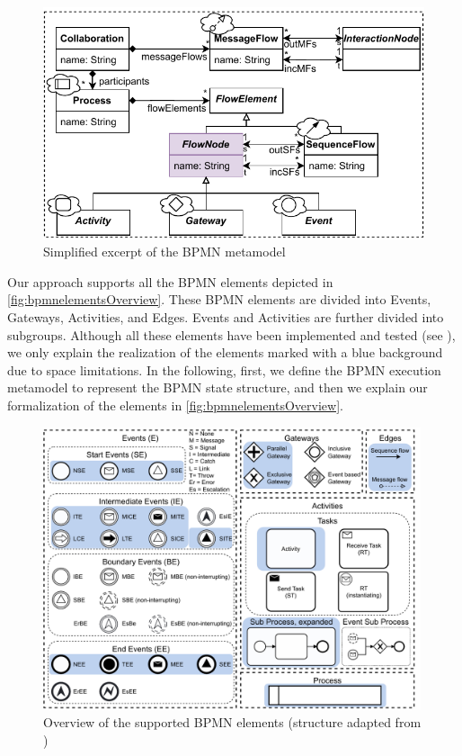 \documentclass{lmcs} %
\begin{document}
\begin{figure}[ht]
  \centering
  \includegraphics[width=0.8\linewidth]{images/bpmn_semantics-bpmn-metamodel.pdf}
  \caption{Simplified excerpt of the BPMN metamodel \cite{objectmanagementgroupBusinessProcessModel2013}}
  \label{fig:bpmnMetamodel}
\end{figure}

Our approach supports all the BPMN elements depicted in \autoref{fig:bpmnelementsOverview}.
These BPMN elements are divided into \textsf{Events}, \textsf{Gateways}, \textsf{Activities}, and \textsf{Edges}.
\textsf{Events} and \textsf{Activities} are further divided into subgroups.
Although all these elements have been implemented and tested (see \cite{timkrauterLMCS2024Artifacts2023}), we only explain the realization of the elements marked with a blue background due to space limitations.
In the following, first, we define the BPMN execution metamodel to represent the BPMN state structure, and then we explain our formalization of the elements in \autoref{fig:bpmnelementsOverview}.


\begin{figure}[ht]
    \centering
    \includegraphics[width=0.99\textwidth]{images/bpmn_semantics-elements-overview.pdf}
    \caption{Overview of the supported BPMN elements (structure adapted from \cite{houhouFirstOrderLogicVerification2022})}
    \label{fig:bpmnelementsOverview}
\end{figure}
\end{document}
